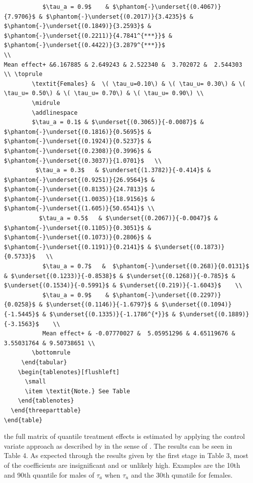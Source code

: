 \documentclass[12pt,a4paper]{article}
\begin{document}
\begin{verbatim}
           $\tau_a = 0.9$    & $\phantom{-}\underset{(0.4067)}{7.9706}$ & $\phantom{-}\underset{(0.2017)}{3.4235}$ & $\phantom{-}\underset{(0.1849)}{3.2593}$ & $\phantom{-}\underset{(0.2211)}{4.7841^{***}}$ & $\phantom{-}\underset{(0.4422)}{3.2879^{***}}$ 
\\ 
Mean effect+ &6.167885 & 2.649243 & 2.522340 &  3.702072 &  2.544303
\\ \toprule
        \textit{Females} &  \( \tau_u=0.10\) & \( \tau_u= 0.30\) & \( \tau_u= 0.50\) & \( \tau_u= 0.70\) & \( \tau_u= 0.90\) \\
        \midrule
        \addlinespace
        $\tau_a = 0.1$ & $\underset{(0.3065)}{-0.0087}$ & $\phantom{-}\underset{(0.1816)}{0.5695}$ & $\phantom{-}\underset{(0.1924)}{0.5237}$ & $\phantom{-}\underset{(0.2308)}{0.3996}$ & $\phantom{-}\underset{(0.3037)}{1.0701}$   \\
         $\tau_a = 0.3$   & $\underset{(1.3782)}{-0.414}$ & $\phantom{-}\underset{(0.9251)}{26.9564}$ & $\phantom{-}\underset{(0.8135)}{24.7813}$ & $\phantom{-}\underset{(1.0035)}{18.9156}$ & $\phantom{-}\underset{(1.605)}{50.6541}$ \\
          $\tau_a = 0.5$   & $\underset{(0.2067)}{-0.0047}$ & $\phantom{-}\underset{(0.1105)}{0.3051}$ & $\phantom{-}\underset{(0.1073)}{0.2806}$ & $\phantom{-}\underset{(0.1191)}{0.2141}$ & $\underset{(0.1873)}{0.5733}$   \\
           $\tau_a = 0.7$   &  $\phantom{-}\underset{(0.268)}{0.0131}$ & $\underset{(0.1233)}{-0.8538}$ & $\underset{(0.1268)}{-0.785}$ & $\underset{(0.1534)}{-0.5991}$ & $\underset{(0.219)}{-1.6043}$    \\
           $\tau_a = 0.9$    & $\phantom{-}\underset{(0.2297)}{0.0258}$ & $\underset{(0.1146)}{-1.6797}$ & $\underset{(0.1094)}{-1.5445}$ & $\underset{(0.1335)}{-1.1786^{*}}$ & $\underset{(0.1889)}{-3.1563}$    \\
           Mean effect+ & -0.07770027 &  5.05951296 & 4.65119676 &  3.55031764 & 9.50738651 \\
        \bottomrule
     \end{tabular}
    \begin{tablenotes}[flushleft]
      \small
      \item \textit{Note.} See Table 
    \end{tablenotes}
  \end{threeparttable}
\end{table}
\end{verbatim}

the full matrix of quantile treatment effects is estimated by applying
the control variate approach as described by \textcite{MaKoenk} in the
sense of \textcite{brunello}. The results can be seen in Table 4. As
expected through the results given by the first stage in Table 3, most
of the coefficients are insignificant and or unlikely high. Examples are
the 10th and 90th quantile for males of \(\tau_a\) when \(\tau_u\) and
the 30th qunatile for females.
\end{document}
